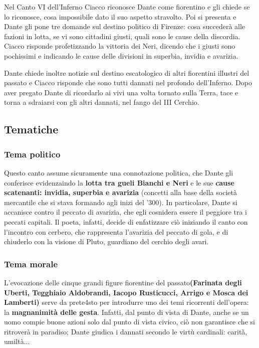 \documentclass[10pt,a4paper]{article}
\begin{document}
	Nel Canto VI dell'Inferno Ciacco riconosce Dante come fiorentino e gli chiede se lo riconosce, cosa impossibile dato il suo aspetto stravolto. Poi si presenta e Dante gli pone tre domande sul destino politico di Firenze: cosa succederà alle fazioni in lotta, se vi sono cittadini giusti, quali sono le cause della discordia. Ciacco risponde profetizzando la vittoria dei Neri, dicendo che i giusti sono pochissimi e indicando le cause delle divisioni in superbia, invidia e avarizia.
	
	Dante chiede inoltre notizie sul destino escatologico di altri fiorentini illustri del passato e Ciacco risponde che sono tutti dannati nel profondo dell'Inferno. Dopo aver pregato Dante di ricordarlo ai vivi una volta tornato sulla Terra, tace e torna a sdraiarsi con gli altri dannati, nel fango del III Cerchio.
	
	\subsection{Tematiche}
	
	\subsubsection{Tema politico}
	
	Questo canto assume sicuramente una connotazione politica, che Dante gli conferisce evidenzaindo la \textbf{lotta tra gueli Bianchi e Neri} e le sue \textbf{cause scatenanti: invidia, superbia e avarizia} (concetti alla base della società mercantile che si stava formando agli inizi del '300). In particolare, Dante si accanisce contro il peccato di avarizia, che egli cosnidera essere il peggiore tra i peccati capitali. Il poeta, infatti, decide di enfatizzare ciò iniziando il canto con l'incontro con cerbero, che rappresenta l'avarizia del peccato di gola, e di chiuderlo con la visione di Pluto, guardiano del cerchio degli avari.
	
	\subsubsection{Tema morale}
	
	L'evocazione delle cinque grandi figure fiorentine del passato\textbf{(Farinata degli Uberti, Tegghiaio Aldobrandi, Iacopo Rusticucci, Arrigo e Mosca dei Lamberti)} serve da prete4sto per introdurre uno dei temi ricorrenti dell'opera: la \textbf{magnanimità delle gesta}. Infatti, dal punto di vista di Dante, anche se un uomo compie buone azioni solo dal punto di vista civico, ciò non garantisce che si ritroverà in paradiso; Dante giudica i dannati secondo le virtù cardinali: carità, umiltà...
	
\end{document}

